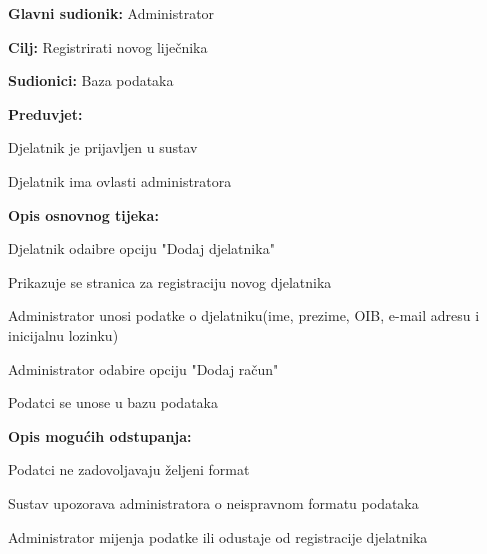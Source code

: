 				\begin{packed_item}
					
					\item \textbf{Glavni sudionik: }Administrator
					\item  \textbf{Cilj: }Registrirati novog liječnika
					\item  \textbf{Sudionici: }Baza podataka
					\item  \textbf{Preduvjet: }
					\item[] \begin{packed_enum}
						
						\item[-] Djelatnik je prijavljen u sustav
						\item[-] Djelatnik ima ovlasti administratora
					\end{packed_enum}
					\item  \textbf{Opis osnovnog tijeka: }
					
					\item[] \begin{packed_enum}
						\item Djelatnik odaibre opciju "Dodaj djelatnika"
						\item Prikazuje se stranica za registraciju novog djelatnika
						\item Administrator unosi podatke o djelatniku(ime, prezime, OIB, e-mail adresu i inicijalnu lozinku)
						\item Administrator odabire opciju "Dodaj račun"
						\item Podatci se unose u bazu podataka
					\end{packed_enum}
					
					\item  \textbf{Opis mogućih odstupanja:}
					
					\item[] \begin{packed_item}
						
						\item[3.a] Podatci ne zadovoljavaju željeni format
						\item[] \begin{packed_enum}
							\item Sustav upozorava administratora o neispravnom formatu podataka
							\item Administrator mijenja podatke ili odustaje od registracije djelatnika							
						\end{packed_enum}
					\end{packed_item}
				\end{packed_item}
				
